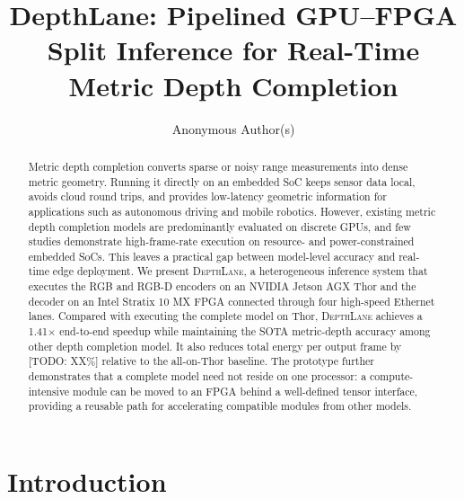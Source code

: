 \documentclass[sigconf]{support/acmart}
\newcommand{\system}{\textsc{DepthLane}}
\newcommand{\todo}[1]{\textcolor{ACMRed}{[TODO: #1]}}
\begin{document}
\title{DepthLane: Pipelined GPU--FPGA Split Inference for Real-Time Metric Depth Completion}

\author{Anonymous Author(s)}

\renewcommand{\shortauthors}{Anonymous Author(s)}

\begin{abstract}
Metric depth completion converts sparse or noisy range measurements into dense
metric geometry.  Running it directly on an embedded SoC keeps sensor data
local, avoids cloud round trips, and provides low-latency geometric information
for applications such as autonomous driving and mobile robotics.  However,
existing metric depth completion models are predominantly evaluated on
discrete GPUs, and few studies demonstrate high-frame-rate execution on
resource- and power-constrained embedded SoCs.  This leaves a practical gap
between model-level accuracy and real-time edge deployment.  We present
\system, a heterogeneous inference system that executes the RGB and RGB-D
encoders on an NVIDIA Jetson AGX Thor and the decoder on an Intel Stratix 10 MX
FPGA connected through four high-speed Ethernet lanes. Compared with
executing the complete model on Thor, \system{} achieves a 1.41$\times$
end-to-end speedup while maintaining the SOTA metric-depth
accuracy among other depth completion model. It also reduces total energy per output frame by \todo{XX\%} relative to the
all-on-Thor baseline.  The prototype further demonstrates that a complete model
need not reside on one processor: a compute-intensive module can be moved to an
FPGA behind a well-defined tensor interface, providing a reusable path for
accelerating compatible modules from other models.  
\end{abstract}


\maketitle

\section{Introduction}
\end{document}
